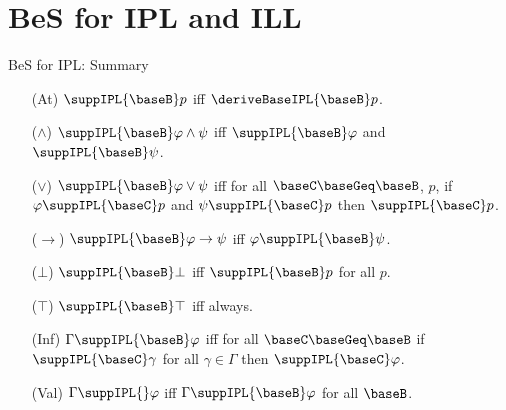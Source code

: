 \documentclass{beamer}
\begin{document}
\section{BeS for IPL and ILL}
\begin{frame}{BeS for IPL: Summary}
	\begin{itemize}
		\item[(At)] $\suppIPL{\baseB}p$ iff $\deriveBaseIPL{\baseB}p$.\vspace{0.3cm}
		\item[($\land$)] $\suppIPL{\baseB}\varphi\land\psi$ iff $\suppIPL{\baseB}\varphi$ and $\suppIPL{\baseB}\psi$.\vspace{0.3cm}
		\item[($\lor$)] $\suppIPL{\baseB}\varphi\lor\psi$ iff for all $\baseC\baseGeq\baseB$, $p$, if $\varphi\suppIPL{\baseC}p$ and $\psi\suppIPL{\baseC}p$ then $\suppIPL{\baseC}p$.\vspace{0.3cm}
		\item[($\to$)] $\suppIPL{\baseB}\varphi\to\psi$ iff $\varphi\suppIPL{\baseB}\psi$.\vspace{0.3cm}
		\item[($\bot$)] $\suppIPL{\baseB}\bot$ iff $\suppIPL{\baseB}p$ for all $p$.\vspace{0.3cm}
		\item[($\top$)] $\suppIPL{\baseB}\top$ iff always.\vspace{0.3cm}
		\item[(Inf)] $\Gamma\suppIPL{\baseB}\varphi$ iff for all $\baseC\baseGeq\baseB$ if $\suppIPL{\baseC}\gamma$ for all $\gamma\in\Gamma$ then $\suppIPL{\baseC}\varphi$.\vspace{0.3cm}
		\item[(Val)] $\Gamma\suppIPL{}\varphi$ iff $\Gamma\suppIPL{\baseB}\varphi$ for all $\baseB$.
	\end{itemize}
\end{frame}
\end{document}
